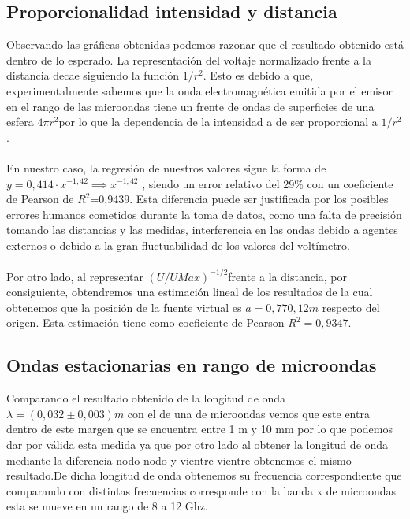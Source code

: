 \documentclass[a4paper,10pt,twocolumns]{article}
\begin{document}
\subsection{Proporcionalidad intensidad y distancia}
Observando las gráficas obtenidas podemos razonar que el resultado obtenido está dentro de lo esperado. La representación del voltaje normalizado frente a la distancia decae siguiendo la función $1/r^2$. Esto es debido a que, experimentalmente sabemos que la onda electromagnética emitida por el emisor en el rango de las microondas tiene un frente de ondas de superficies de una esfera  $4\pi r^2$por lo que la dependencia de la intensidad a de ser proporcional a $1/r^2$. 
\\
\\
En nuestro caso, la regresión de nuestros valores sigue la forma de $y=0,414\cdot x^{-1,42} \implies x^{-1,42}$ , siendo un error relativo del 29\% con un coeficiente de Pearson de $R^2$=0,9439. Esta diferencia puede ser justificada por los posibles errores humanos cometidos durante la toma de datos, como una falta de precisión tomando las distancias y las medidas, interferencia en las ondas debido a agentes externos o debido a la gran fluctuabilidad de los valores del voltímetro. 
\\
\\

Por otro lado, al representar $(U/UMax)^{-1/2}$frente a la distancia, por consiguiente, obtendremos una estimación lineal de los resultados de la cual obtenemos que la posición de la fuente virtual es $a=0,770,12 m$ respecto del origen. Esta estimación tiene como coeficiente de Pearson $R^2=0,9347$.

\subsection{Ondas estacionarias en rango de microondas}
Comparando el resultado obtenido de la longitud de onda $\lambda=(0,032 \pm 0,003)m$ con el de una de microondas vemos que este entra dentro de este margen que se encuentra entre 1 m y 10 mm por lo que podemos dar por válida esta medida ya que por otro lado al obtener la longitud de onda mediante la diferencia nodo-nodo y vientre-vientre obtenemos el mismo resultado.De dicha longitud de onda obtenemos su frecuencia correspondiente que comparando con distintas frecuencias corresponde con la banda x de microondas esta se mueve en un rango de 8 a 12 Ghz.
\\
\\
\end{document}
